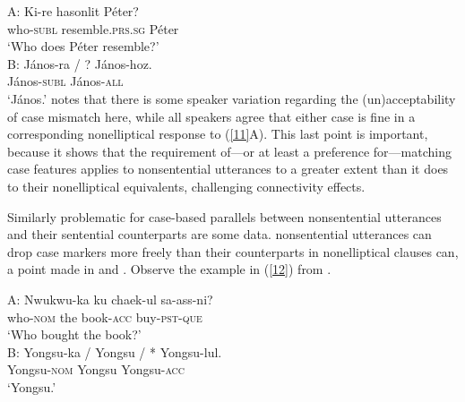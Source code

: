 \ea
A: \gll Ki-re             hasonlit         Péter?\\
        who-\textsc{subl} resemble.\textsc{prs}.\textsc{sg}  Péter\\
\glt  \hphantom{A:~}`Who does Péter resemble?'\\
B: \gll J\'{a}nos-ra / ? J\'{a}nos-hoz.\\
        J\'{a}nos-\textsc{subl} {} {} J\'{a}nos-\textsc{all}\\
\glt  \hphantom{B:~}`J\'{a}nos.'\label{11}
\z
%
\citet{Jacobson2016} notes that there is some speaker variation regarding the (un)ac\-cepta\-bi\-li\-ty of case mismatch here, while all speakers agree that either case is fine in a corresponding nonelliptical response to (\ref{11}A). This last point is important, because it shows that the requirement of---or at least a preference for---matching case features applies to nonsentential utterances to a greater extent than it does to their nonelliptical equivalents, challenging connectivity effects.

Similarly problematic for case-based parallels between nonsentential utterances and their sentential counterparts are some  data.  nonsentential utterances can drop case markers more freely than their counterparts in nonelliptical clauses can, a point made in \citet{Morgan1989} and \citet{Kim2015}. Observe the example in (\ref{12}) from \citet[237]{Morgan1989}.

\ea
A: \gll Nwukwu-ka        ku  chaek-ul          sa-ass-ni?\\
        who-\textsc{nom} the book-\textsc{acc} buy-\textsc{pst}-\textsc{que}\\
\glt  \hphantom{A:~}`Who bought the book?'\\

B: \gll Yongsu-ka / Yongsu / * Yongsu-lul.\\
        Yongsu-\textsc{nom} {} Yongsu {} {} Yongsu-\textsc{acc}\\
\glt  \hphantom{B:~}`Yongsu.'

